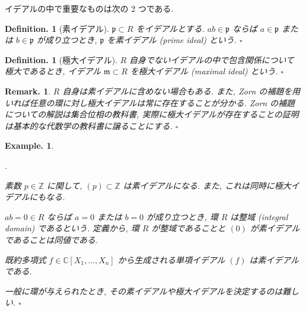 \documentclass[openany, a4paper, oneside]{jsbook}
\newcounter{enum2}
\renewenvironment{enumerate}{%
\begin{list}%
{%
\arabic{enum2}.\ \,%
}%
{%
\usecounter{enum2}
\setlength{\itemindent}{0pt}%
\setlength{\leftmargin}{15pt}%
\setlength{\rightmargin}{0pt}%
\setlength{\labelsep}{0pt}%
\setlength{\labelwidth}{6pt}%
\setlength{\itemsep}{0pt}%
\setlength{\parsep}{0pt}%
\setlength{\listparindent}{0pt}%
}
}{%
\end{list}%
}
\theoremstyle{break}
\theoremstyle{breakdefn}
\newtheorem{defn}[thm]{Definition.}
\newtheorem{ex}[thm]{Example.}
\newtheorem{rem}[thm]{Remark.}
\newcommand{\fin}{\hfill $\square$ \par}
\begin{document}
イデアルの中で重要なものは次の 2 つである.
\begin{defn}[素イデアル]
$\mathfrak{p} \subset R$ をイデアルとする.
$ab \in \mathfrak{p}$ ならば $a\in \mathfrak{p}$ または $b \in \mathfrak{p}$ が成り立つとき, $\mathfrak{p}$ を素イデアル (prime ideal) という. \fin
\end{defn}
\begin{defn}[極大イデアル]
$R$ 自身でないイデアルの中で包含関係について極大であるとき, イデアル $\mathfrak{m} \subset R$ を極大イデアル (maximal ideal) という. \fin
\end{defn}
\begin{rem}
$R$ 自身は素イデアルに含めない場合もある.
また, Zorn の補題を用いれば任意の環に対し極大イデアルは常に存在することが分かる.
Zorn の補題についての解説は集合位相の教科書, 実際に極大イデアルが存在することの証明は基本的な代数学の教科書に譲ることにする. \fin
\end{rem}
\begin{ex}
\begin{enumerate}
\item 素数 $p \in \mathbb{Z}$ に関して, $(p) \subset \mathbb{Z}$ は素イデアルになる.
   また, これは同時に極大イデアルにもなる.
\item $ab = 0 \in R$ ならば $a=0$ または $b=0$ が成り立つとき, 環 $R$ は整域 (integral domain) であるという.
   定義から, 環 $R$ が整域であることと $(0)$ が素イデアルであることは同値である.
\item 既約多項式 $f \in \mathbb{C}[X_1,\dots,X_n]$ から生成される単項イデアル $(f)$ は素イデアルである.
\item 一般に環が与えられたとき, その素イデアルや極大イデアルを決定するのは難しい. \fin
\end{enumerate}
\end{ex}
\end{document}
